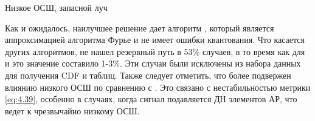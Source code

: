 \begin{table}[H]
  \begin{center}
    \caption{Низкое ОСШ, запасной луч}
    \label{tab:multipath:static:LOW-SNR:2}
  \end{center}
\end{table}

Как и ожидалось, наилучшее решение дает алгоритм \hSearchMMSE{}, который
является аппроксимацией алгоритма Фурье и не имеет ошибки квантования. Что
касается других алгоритмов, \ACS{} не
нашел резервный путь в 53\% случаев, в то время как  для \AuxBeam{} и \hSearchMMSE{} 
это значение составило 1-3\%.  Эти случаи были исключены из набора
данных для получения CDF и таблиц. Также следует отметить, что \AuxBeam{}
более подвержен влиянию низкого ОСШ по сравнению с \hSearchMMSE{}. 
Это связано с нестабильностью метрики \eqref{eq:4.39}, особенно в случаях, когда 
сигнал подавляется ДН элементов АР, что ведет к чрезвычайно низкому ОСШ.